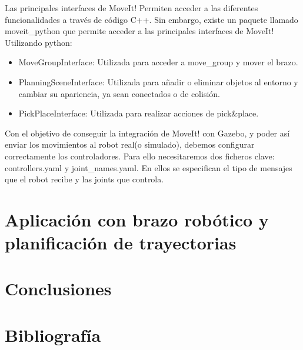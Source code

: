 \documentclass[12pt,spanish,chapterprefix, numbers=noenddot]{book}
\numberwithin{equation}{section}
\numberwithin{figure}{section}
\begin{document}
Las principales interfaces de MoveIt! Permiten acceder a las diferentes funcionalidades a través de código C++. Sin embargo, existe un paquete llamado moveit\_python que permite acceder a las principales interfaces de MoveIt! Utilizando python:
\begin{itemize}
\item MoveGroupInterface: Utilizada para acceder a move\_group y mover el brazo. 
\item PlanningSceneInterface: Utilizada para añadir o eliminar objetos al entorno y cambiar su apariencia, ya sean conectados o de colisión. 
\item PickPlaceInterface: Utilizada para realizar acciones de pick&place.
\end{itemize}

Con el objetivo de conseguir la integración de MoveIt! con Gazebo, y poder así enviar los movimientos al robot real(o simulado), debemos configurar correctamente los controladores. Para ello necesitaremos dos ficheros clave: controllers.yaml y joint\_names.yaml.  En ellos se especifican el tipo de mensajes que el robot recibe y las joints que controla.  

\chapter{Aplicación con brazo robótico y planificación de trayectorias}

\chapter{Conclusiones}

\chapter*{Bibliografía}
\end{document}
